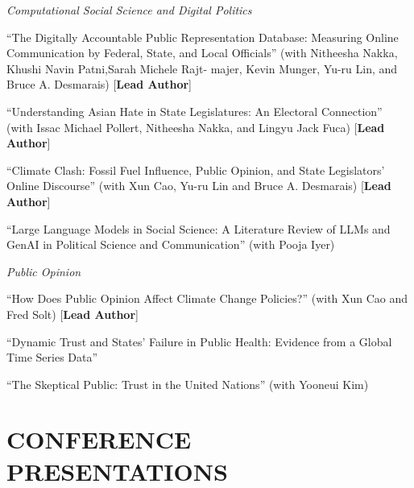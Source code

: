 \documentclass[10.5pt,]{article}
\renewenvironment{itemize}{
	\begin{list}{}{
			\setlength{\leftmargin}{1.5em}
		}
	}{
	\end{list}
}
\begin{document}
\begin{itemize}
  \begin{itemize}
  \item
    \emph{Computational Social Science and Digital Politics}
  \item
    ``The Digitally Accountable Public Representation Database:
    Measuring Online Communication by Federal, State, and Local
    Oﬀicials'' (with Nitheesha Nakka, Khushi Navin Patni,Sarah Michele
    Rajt- majer, Kevin Munger, Yu-ru Lin, and Bruce A. Desmarais)
    {[}\textbf{Lead Author}{]}
  \item
    ``Understanding Asian Hate in State Legislatures: An Electoral
    Connection'' (with Issac Michael Pollert, Nitheesha Nakka, and
    Lingyu Jack Fuca) {[}\textbf{Lead Author}{]}
  \item
    ``Climate Clash: Fossil Fuel Influence, Public Opinion, and State
    Legislators' Online Discourse'' (with Xun Cao, Yu-ru Lin and Bruce
    A. Desmarais) {[}\textbf{Lead Author}{]}
  \item
    ``Large Language Models in Social Science: A Literature Review of
    LLMs and GenAI in Political Science and Communication'' (with Pooja
    Iyer)
  \item
    \emph{Public Opinion}
  \item
    ``How Does Public Opinion Affect Climate Change Policies?'' (with
    Xun Cao and Fred Solt) {[}\textbf{Lead Author}{]}
  \item
    ``Dynamic Trust and States' Failure in Public Health: Evidence from
    a Global Time Series Data''
  \item
    ``The Skeptical Public: Trust in the United Nations'' (with Yooneui
    Kim)
  \end{itemize}
\end{itemize}

\section{CONFERENCE PRESENTATIONS}\label{conference-presentations}
\end{document}
